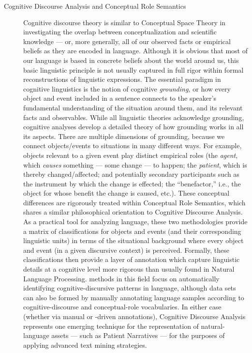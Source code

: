 \documentclass[11pt,letterpaper]{article}
\newcommand{\AI}{\resizebox{!}{7pt}{\AcronymText{AI}}}
\newcommand{\lAI}{\resizebox{!}{7.5pt}{\AcronymText{AI}}}
\newcommand{\textscc}[1]{{\color{orr!35!black}{{%
						\fontfamily{Cabin-TLF}\fontseries{b}\selectfont{\textsc{\scriptsize{#1}}}}}}}
\newcommand{\AcronymText}[1]{{\textscc{#1}}}
\newcommand{\q}[1]{{\fontfamily{qcr}\selectfont ``}#1{\fontfamily{qcr}\selectfont ''}}
\begin{document}
{{\begin{description}
\item[Cognitive Discourse Analysis and 
Conceptual Role Semantics]  Cognitive discourse 
theory is similar to Conceptual Space Theory in 
investigating the overlap between conceptualization 
and scientific knowledge --- or, more generally, 
all of our observed facts or empirical beliefs 
as they are encoded in language.  Although it is 
obvious that most of our language is based in 
concrete beliefs about the world around us, this 
basic linguistic principle is not usually 
captured in full rigor within formal reconstructions 
of linguistic expressions.  The essential paradigm 
in cognitive linguistics is the notion of 
cognitive \textit{grounding,} or how every 
object and event included in a sentence 
connects to the speaker's fundamental understanding 
of the situation around them, and its relevant 
facts and observables.  While all linguistic theories 
acknowledge grounding, cognitive analyses 
develop a detailed theory of how grounding works in 
all its aspects.  There are multiple dimensions of 
grounding, because we connect objects/events 
to situations in many different ways.  For example, 
objects relevant to a given event play distinct 
empirical roles (the \textit{agent}, which 
\textit{causes} something --- some change --- to happen; 
the \textit{patient}, which is thereby changed/affected; 
and potentially secondary participants such as the 
instrument by which the change is effected; the 
\q{benefactor,} i.e., the object for whose benefit 
the change is caused, etc.).  These conceptual differences 
are rigorously treated within Conceptual Role Semantics, 
which shares a similar philosophical orientation to 
Cognitive Discourse Analysis.  As a practical tool 
for analyzing language, these two methodologies 
provide a matrix of classifications for objects 
and events (and their corresponding linguistic 
units) in terms of the situational background 
where every object and event (in a given discursive 
context) is perceived.  Formally, these classifications 
then provide a layer of annotation which capture 
linguistic details at a cognitive level more rigorous 
than usually found in Natural Language Processing.  
\lAI{} methods in this field focus on automatically 
identifying cognitive-discursive patterns in language, 
although data sets can also be formed by manually 
annotating language samples according to 
cognitive-discourse and conceptual-role vocabularies.  
In either case (whether via manual or \AI{}-driven 
annotations), Cognitive Discourse Analysis represents 
one emerging technique for the representation 
of natural-language assets --- such as Patient Narratives 
--- for the purposes of applying advanced text mining 
strategies.
\end{description} 
}


}
\end{document}
